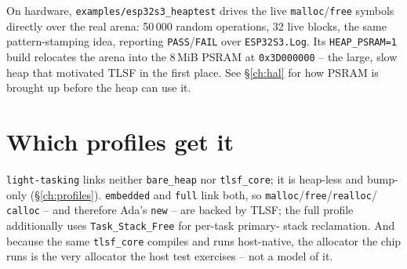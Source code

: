On hardware, \texttt{examples/esp32s3\_heaptest} drives the live
\texttt{malloc}/\texttt{free} symbols directly over the real arena: 50\,000 random
operations, 32 live blocks, the same pattern-stamping idea, reporting
\texttt{PASS}/\texttt{FAIL} over \texttt{ESP32S3.Log}. Its \texttt{HEAP\_PSRAM=1}
build relocates the arena into the 8\,MiB PSRAM at \texttt{0x3D000000} -- the
large, slow heap that motivated TLSF in the first place. See \S\ref{ch:hal} for
how PSRAM is brought up before the heap can use it.

\section{Which profiles get it}

\texttt{light-tasking} links neither \texttt{bare\_heap} nor \texttt{tlsf\_core};
it is heap-less and bump-only (\S\ref{ch:profiles}). \texttt{embedded} and
\texttt{full} link both, so \texttt{malloc}/\texttt{free}/\texttt{realloc}/%
\texttt{calloc} -- and therefore Ada's \texttt{new} -- are backed by TLSF; the
full profile additionally uses \texttt{Task\_Stack\_Free} for per-task primary-%
stack reclamation. And because the same \texttt{tlsf\_core} compiles and runs
host-native, the allocator the chip runs is the very allocator the host test
exercises -- not a model of it.
